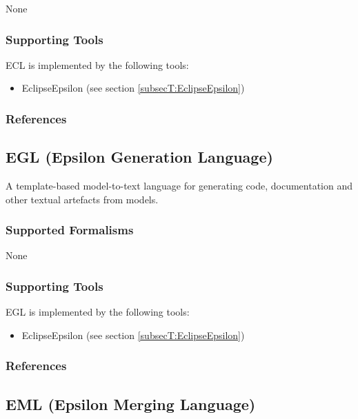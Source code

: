 None


\subsubsection{Supporting Tools}

ECL is implemented by the following tools:
\begin{itemize}
	\item EclipseEpsilon (see section \ref{subsecT:EclipseEpsilon})
\end{itemize}


\subsubsection{References}





\subsection{EGL (Epsilon Generation Language)}
\label{subsecL:EGL}


A template-based model-to-text language for generating code, documentation and other textual artefacts from models.

\subsubsection{Supported Formalisms}

None


\subsubsection{Supporting Tools}

EGL is implemented by the following tools:
\begin{itemize}
	\item EclipseEpsilon (see section \ref{subsecT:EclipseEpsilon})
\end{itemize}


\subsubsection{References}





\subsection{EML (Epsilon Merging Language)}
\label{subsecL:EML}

